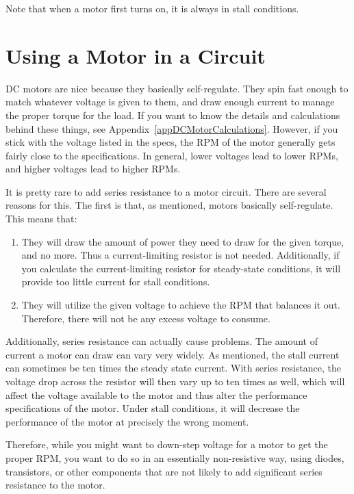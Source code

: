 Note that when a motor first turns on, it is always in stall conditions.

\section{Using a Motor in a Circuit}

DC motors are nice because they basically self-regulate.  
They spin fast enough to match whatever voltage is given to them, and draw enough current to manage the proper torque for the load.
If you want to know the details and calculations behind these things, see Appendix~\ref{appDCMotorCalculations}.
However, if you stick with the voltage listed in the specs, the RPM of the motor generally gets fairly close to the specifications.
In general, lower voltages lead to lower RPMs, and higher voltages lead to higher RPMs.

It is pretty rare to add series resistance to a motor circuit.
There are several reasons for this.
The first is that, as mentioned, motors basically self-regulate.
This means that:
\begin{enumerate}
\item They will draw the amount of power they need to draw for the given torque, and no more.  Thus a current-limiting resistor is not needed.  Additionally, if you calculate the current-limiting resistor for steady-state conditions, it will provide too little current for stall conditions.
\item They will utilize the given voltage to achieve the RPM that balances it out.  Therefore, there will not be any excess voltage to consume.
\end{enumerate}

Additionally, series resistance can actually cause problems.
The amount of current a motor can draw can vary very widely.
As mentioned, the stall current can sometimes be ten times the steady state current.
With series resistance, the voltage drop across the resistor will then vary up to ten times as well, which will affect the voltage available to the motor and thus alter the performance specifications of the motor.
Under stall conditions, it will decrease the performance of the motor at precisely the wrong moment.

Therefore, while you might want to down-step voltage for a motor to get the proper RPM, you want to do so in an essentially non-resistive way, using diodes, transistors, or other components that are not likely to add significant series resistance to the motor.

